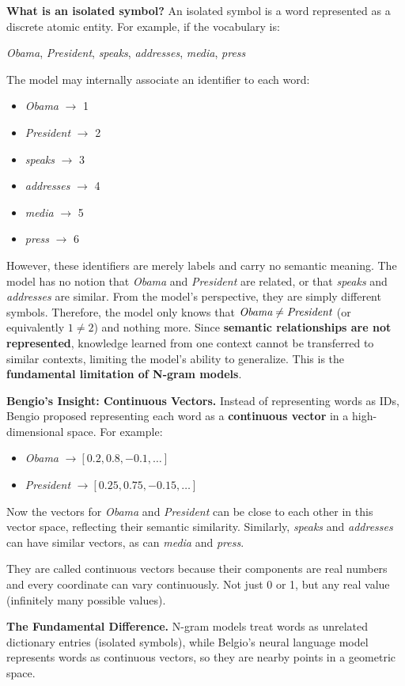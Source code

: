 \begin{remarkbox}
    \highspace
    \textcolor{Green3}{ \textbf{What is an isolated symbol?}} An isolated symbol is a word represented as a discrete atomic entity. For example, if the vocabulary is:
    \begin{center}
        \emph{Obama}, \emph{President}, \emph{speaks}, \emph{addresses}, \emph{media}, \emph{press}
    \end{center}
    The model may internally associate an identifier to each word:
    \begin{itemize}
        \item \emph{Obama} $\to$ 1
        \item \emph{President} $\to$ 2
        \item \emph{speaks} $\to$ 3
        \item \emph{addresses} $\to$ 4
        \item \emph{media} $\to$ 5
        \item \emph{press} $\to$ 6
    \end{itemize}
    However, these identifiers are merely labels and carry no semantic meaning. The model has no notion that \emph{Obama} and \emph{President} are related, or that \emph{speaks} and \emph{addresses} are similar. From the model's perspective, they are simply different symbols. Therefore, the model only knows that $\emph{Obama} \neq \emph{President}$ (or equivalently $1 \neq 2$) and nothing more. Since \textbf{semantic relationships are not represented}, knowledge learned from one context cannot be transferred to similar contexts, limiting the model's ability to generalize. This is the \textbf{fundamental limitation of N-gram models}.

    \highspace
    \textcolor{Green3}{ \textbf{Bengio's Insight: Continuous Vectors.}} Instead of representing words as IDs, Bengio proposed representing each word as a \textbf{continuous vector} in a high-dimensional space. For example:
    \begin{itemize}
        \item \emph{Obama} $\to [0.2, 0.8, -0.1, \dots]$
        \item \emph{President} $\to [0.25, 0.75, -0.15, \dots]$
    \end{itemize}
    Now the vectors for \emph{Obama} and \emph{President} can be close to each other in this vector space, reflecting their semantic similarity. Similarly, \emph{speaks} and \emph{addresses} can have similar vectors, as can \emph{media} and \emph{press}.

    They are called continuous vectors because their components are real numbers and every coordinate can vary continuously. Not just 0 or 1, but any real value (infinitely many possible values).

    \highspace
    \textcolor{DarkOrange3}{ \textbf{The Fundamental Difference.}} N-gram models treat words as unrelated dictionary entries (isolated symbols), while Belgio's neural language model represents words as continuous vectors, so they are nearby points in a geometric space.
\end{remarkbox}

